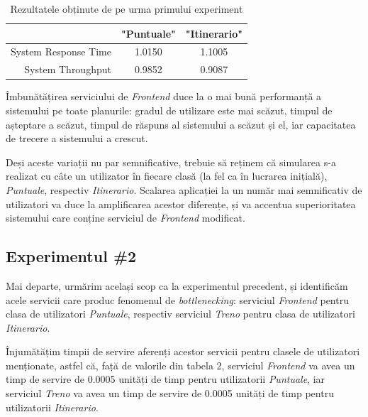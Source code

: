 \documentclass[12pt]{article}
\begin{document}
            \begin{table}[!h]
                \centering
                \begin{tabular}{r|cc}
                    \multicolumn{1}{c|}{} & "Puntuale" & "Itinerario" \\ \hline
                    System Response Time  & 1.0150     & 1.1005       \\
                    System Throughput     & 0.9852     & 0.9087      
                \end{tabular}
                \caption{Rezultatele obținute de pe urma primului experiment}
            \end{table}

            Îmbunătățirea serviciului de \textit{Frontend} duce la o mai bună performanță a sistemului pe toate planurile: gradul de utilizare este mai scăzut, timpul de așteptare a scăzut, timpul de răspuns al sistemului a scăzut și el, iar capacitatea de trecere a sistemului a crescut.

            Deși aceste variații nu par semnificative, trebuie să reținem că simularea s-a realizat cu câte un utilizator în fiecare clasă (la fel ca în lucrarea inițială), \textit{Puntuale}, respectiv \textit{Itinerario}. Scalarea aplicației la un număr mai semnificativ de utilizatori va duce la amplificarea acestor diferențe, și va accentua superioritatea sistemului care conține serviciul de \textit{Frontend} modificat.
        
        \subsection{Experimentul \#2}
            Mai departe, urmărim același scop ca la experimentul precedent, și identificăm acele servicii care produc fenomenul de \textit{bottlenecking}: serviciul \textit{Frontend} pentru clasa de utilizatori \textit{Puntuale}, respectiv serviciul \textit{Treno} pentru clasa de utilizatori \textit{Itinerario}.
            
            Înjumătățim timpii de servire aferenți acestor servicii pentru clasele de utilizatori menționate, astfel că, față de valorile din tabela 2, serviciul \textit{Frontend} va avea un timp de servire de 0.0005 unități de timp pentru utilizatorii \textit{Puntuale}, iar serviciul \textit{Treno} va avea un timp de servire de 0.0005 unități de timp pentru utilizatorii \textit{Itinerario}.
            \pagebreak
\end{document}
